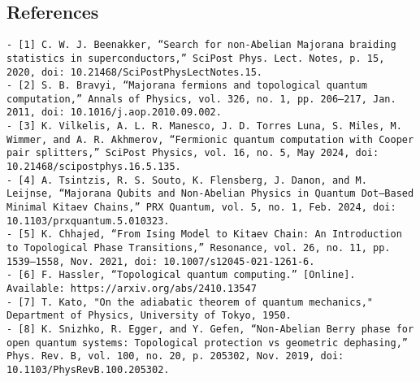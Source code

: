 \documentclass[11pt,landscape]{article}
\begin{document}
\subsection{References}\label{references}

\begin{verbatim}
- [1] C. W. J. Beenakker, “Search for non-Abelian Majorana braiding statistics in superconductors,” SciPost Phys. Lect. Notes, p. 15, 2020, doi: 10.21468/SciPostPhysLectNotes.15.
- [2] S. B. Bravyi, “Majorana fermions and topological quantum computation,” Annals of Physics, vol. 326, no. 1, pp. 206–217, Jan. 2011, doi: 10.1016/j.aop.2010.09.002.
- [3] K. Vilkelis, A. L. R. Manesco, J. D. Torres Luna, S. Miles, M. Wimmer, and A. R. Akhmerov, “Fermionic quantum computation with Cooper pair splitters,” SciPost Physics, vol. 16, no. 5, May 2024, doi: 10.21468/scipostphys.16.5.135.
- [4] A. Tsintzis, R. S. Souto, K. Flensberg, J. Danon, and M. Leijnse, “Majorana Qubits and Non-Abelian Physics in Quantum Dot–Based Minimal Kitaev Chains,” PRX Quantum, vol. 5, no. 1, Feb. 2024, doi: 10.1103/prxquantum.5.010323.
- [5] K. Chhajed, “From Ising Model to Kitaev Chain: An Introduction to Topological Phase Transitions,” Resonance, vol. 26, no. 11, pp. 1539–1558, Nov. 2021, doi: 10.1007/s12045-021-1261-6.
- [6] F. Hassler, “Topological quantum computing.” [Online]. Available: https://arxiv.org/abs/2410.13547
- [7] T. Kato, "On the adiabatic theorem of quantum mechanics," Department of Physics, University of Tokyo, 1950.
- [8] K. Snizhko, R. Egger, and Y. Gefen, “Non-Abelian Berry phase for open quantum systems: Topological protection vs geometric dephasing,” Phys. Rev. B, vol. 100, no. 20, p. 205302, Nov. 2019, doi: 10.1103/PhysRevB.100.205302.
\end{verbatim}


    
    
    
\end{document}
